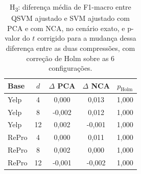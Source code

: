 \begin{table}[t]
\centering
\caption{H\textsubscript{3}: diferença média de F1-macro entre QSVM ajustado e SVM ajustado com PCA e com NCA, no cenário exato, e p-valor do $t$ corrigido para a mudança dessa diferença entre as duas compressões, com correção de Holm sobre as 6 configurações.}
\label{tab:h3}
\footnotesize
\begin{tabular}{lcccc}
\hline
Base & $d$ & $\Delta$ PCA & $\Delta$ NCA & $p_{\mathrm{Holm}}$ \\
\hline
Yelp & 4 & 0,000 & 0,013 & 1,000 \\
Yelp & 8 & -0,002 & 0,012 & 1,000 \\
Yelp & 12 & 0,002 & -0,001 & 1,000 \\
RePro & 4 & 0,000 & 0,011 & 1,000 \\
RePro & 8 & 0,002 & 0,000 & 1,000 \\
RePro & 12 & -0,001 & -0,002 & 1,000 \\
\hline
\end{tabular}
\end{table}